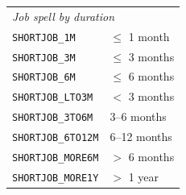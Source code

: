 \begin{landscape}
\begin{ThreePartTable}
\begin{longtable}{@{}p{9cm}p{9cm}@{}}
\multicolumn{2}{l}{\textit{Job spell by duration}}\\[0.2em]
\texttt{SHORTJOB\_1M}     & $\leq$ 1 month\\
\texttt{SHORTJOB\_3M}     & $\leq$ 3 months\\
\texttt{SHORTJOB\_6M}     & $\leq$ 6 months\\
\texttt{SHORTJOB\_LTO3M}  & $<$ 3 months\\
\texttt{SHORTJOB\_3TO6M}  & 3–6 months\\
\texttt{SHORTJOB\_6TO12M} & 6–12 months\\
\texttt{SHORTJOB\_MORE6M} & $>$ 6 months\\
\texttt{SHORTJOB\_MORE1Y} & $>$ 1 year\\

\end{longtable}
\end{ThreePartTable}
\end{landscape}

